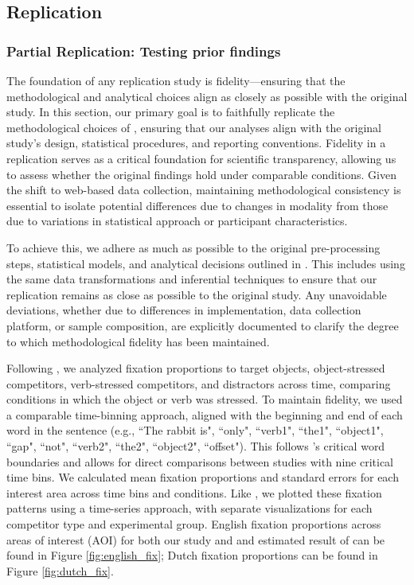 \subsection{Replication}
\subsubsection{Partial Replication: Testing prior findings}

The foundation of any replication study is fidelity—ensuring that the methodological and analytical choices align as closely as possible with the original study. In this section, our primary goal is to faithfully replicate the methodological choices of \citep{Ge2021}, ensuring that our analyses align with the original study’s design, statistical procedures, and reporting conventions. Fidelity in a replication serves as a critical foundation for scientific transparency, allowing us to assess whether the original findings hold under comparable conditions. Given the shift to web-based data collection, maintaining methodological consistency is essential to isolate potential differences due to changes in modality from those due to variations in statistical approach or participant characteristics.

To achieve this, we adhere as much as possible to the original pre-processing steps, statistical models, and analytical decisions outlined in \citep{Ge2021}. This includes using the same data transformations and inferential techniques to ensure that our replication remains as close as possible to the original study. Any unavoidable deviations, whether due to differences in implementation, data collection platform, or sample composition, are explicitly documented to clarify the degree to which methodological fidelity has been maintained.

Following \cite{Ge2021}, we analyzed fixation proportions to target objects, object-stressed competitors, verb-stressed competitors, and distractors across time, comparing conditions in which the object or verb was stressed. To maintain fidelity, we used a comparable time-binning approach, aligned with the beginning and end of each word in the sentence (e.g., ``The rabbit is", ``only", ``verb1", ``the1", ``object1", ``gap", ``not", ``verb2", ``the2", ``object2", ``offset"). This follows \cite{Ge2021}’s critical word boundaries and allows for direct comparisons between studies with nine critical time bins. We calculated mean fixation proportions and standard errors for each interest area across time bins and conditions. Like \cite{Ge2021}, we plotted these fixation patterns using a time-series approach, with separate visualizations for each competitor type and experimental group. English fixation proportions across areas of interest (AOI) for both our study and and estimated result of \cite{Ge2021} can be found in Figure \ref{fig:english_fix}; Dutch fixation proportions can be found in Figure \ref{fig:dutch_fix}.

